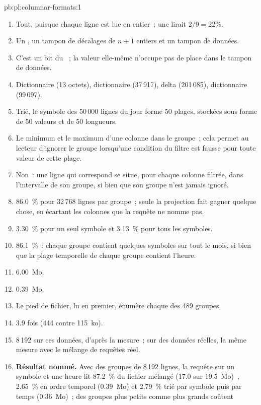 \begin{solution}{pb:pl:columnar-formats:1}
\begin{enumerate}
\item Tout, puisque chaque ligne est lue en entier~; une  lirait $2/9 = 22\%$.
\item Un , un tampon de décalages de $n+1$ entiers et un tampon de données.
\item C'est un bit du ~; la valeur elle-même n'occupe pas de place dans le tampon de données.
\item Dictionnaire (13 octets), dictionnaire (37\,917), delta (201\,085), dictionnaire (99\,097).
\item Trié, le symbole des 50\,000 lignes du jour forme 50 plages, stockées sous forme de 50 valeurs et de 50 longueurs.
\item Le minimum et le maximum d'une colonne dans le groupe~; cela permet au lecteur d'ignorer le groupe lorsqu'une condition du filtre
est fausse pour toute valeur de cette plage.
\item Non~: une ligne qui correspond se situe, pour chaque colonne filtrée, dans l'intervalle de son groupe, si bien que son groupe n'est jamais ignoré.
\item 86.0~\% pour 32\,768 lignes par groupe~; seule la projection fait gagner quelque chose, en écartant les colonnes que la requête ne nomme pas.
\item 3.30~\% pour un seul symbole et 3.13~\% pour tous les symboles.
\item 86.1~\%~: chaque groupe contient quelques symboles sur tout le mois, si bien que la plage temporelle de chaque groupe contient l'heure.
\item 6.00~Mo.
\item 0.39~Mo.
\item Le pied de fichier, lu en premier, énumère chaque  des 489 groupes.
\item 3.9 fois (444 contre 115~ko).
\item 8\,192 sur ces données, d'après la mesure~; sur des données réelles, la même mesure avec le mélange de requêtes réel.
\item \textbf{Résultat nommé.} Avec des groupes de 8\,192 lignes, la requête sur un symbole et une heure lit 87.2~\% du fichier mélangé (17.0 sur
19.5~Mo)~, 2.65~\% en ordre temporel (0.39~Mo) et 2.79~\% trié par symbole puis par temps (0.36~Mo)~; des groupes plus petits comme plus grands coûtent

\end{enumerate}
\end{solution}
